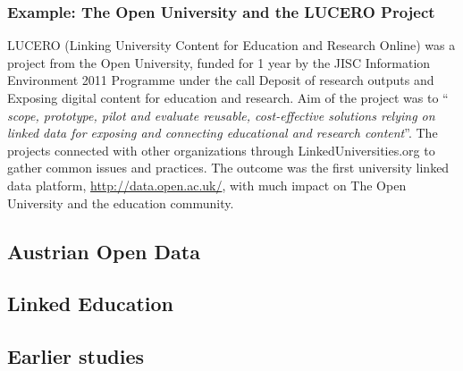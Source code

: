 \documentclass{article}
\begin{document}
\subsubsection{Example: The Open University and the LUCERO Project}
LUCERO (Linking University Content for Education and Research Online) was a project from the Open University, funded for 1 year by the JISC Information Environment 2011 Programme under the call Deposit of research outputs and Exposing digital content for education and research. Aim of the project was to "` \textit{ scope, prototype, pilot and evaluate reusable, cost-effective solutions relying on linked data for exposing and connecting educational and research content}"'.\cite{url:lucero} The projects connected with other organizations through LinkedUniversities.org to gather common issues and practices. The outcome was the first university linked data platform, \url{http://data.open.ac.uk/}, with much impact on The Open University and the education community.

\subsection{Austrian Open Data}
\label{related-work:austrian-open-data}


\subsection{Linked Education}
\label{related-work:austrian-open-data}


\subsection{Earlier studies}
\label{related-work:earlier-studies}



\end{document}
